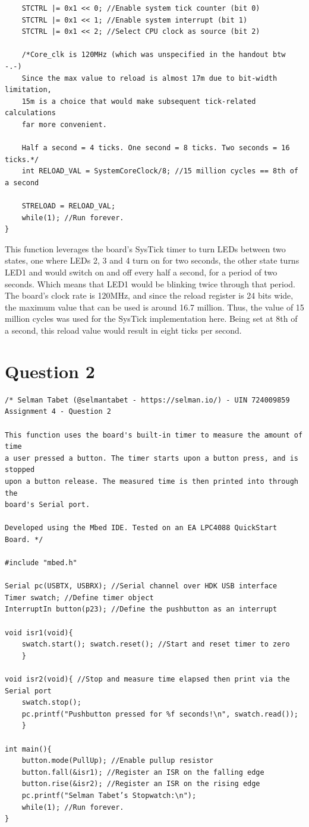 \documentclass{article}
\begin{document}
\begin{verbatim}
    STCTRL |= 0x1 << 0; //Enable system tick counter (bit 0)
    STCTRL |= 0x1 << 1; //Enable system interrupt (bit 1)
    STCTRL |= 0x1 << 2; //Select CPU clock as source (bit 2)
    
    /*Core_clk is 120MHz (which was unspecified in the handout btw -.-)
    Since the max value to reload is almost 17m due to bit-width limitation,
    15m is a choice that would make subsequent tick-related calculations 
    far more convenient.
    
    Half a second = 4 ticks. One second = 8 ticks. Two seconds = 16 ticks.*/
    int RELOAD_VAL = SystemCoreClock/8; //15 million cycles == 8th of a second

    STRELOAD = RELOAD_VAL;
    while(1); //Run forever.
}
\end{verbatim}


This function leverages the board's SysTick timer to turn LEDs between two states, one where LEDs 2, 3 and 4 turn on for two seconds, the other state turns LED1 and would switch on and off every half a second, for a period of two seconds. Which means that LED1 would be blinking twice through that period.
The board's clock rate is 120MHz, and since the reload register is 24 bits wide, the maximum value that can be used is around 16.7 million. Thus, the value of 15 million cycles was used for the SysTick implementation here. Being set at 8th of a second, this reload value would result in eight ticks per second.\pagebreak



\section*{Question 2}
\begin{verbatim}
/* Selman Tabet (@selmantabet - https://selman.io/) - UIN 724009859
Assignment 4 - Question 2

This function uses the board's built-in timer to measure the amount of time
a user pressed a button. The timer starts upon a button press, and is stopped
upon a button release. The measured time is then printed into through the
board's Serial port.

Developed using the Mbed IDE. Tested on an EA LPC4088 QuickStart Board. */

#include "mbed.h"

Serial pc(USBTX, USBRX); //Serial channel over HDK USB interface
Timer swatch; //Define timer object
InterruptIn button(p23); //Define the pushbutton as an interrupt

void isr1(void){
    swatch.start(); swatch.reset(); //Start and reset timer to zero
    }
    
void isr2(void){ //Stop and measure time elapsed then print via the Serial port
    swatch.stop();
    pc.printf("Pushbutton pressed for %f seconds!\n", swatch.read());
    }

int main(){
    button.mode(PullUp); //Enable pullup resistor
    button.fall(&isr1); //Register an ISR on the falling edge
    button.rise(&isr2); //Register an ISR on the rising edge
    pc.printf("Selman Tabet’s Stopwatch:\n");
    while(1); //Run forever.
}
\end{verbatim}
\pagebreak
\end{document}
